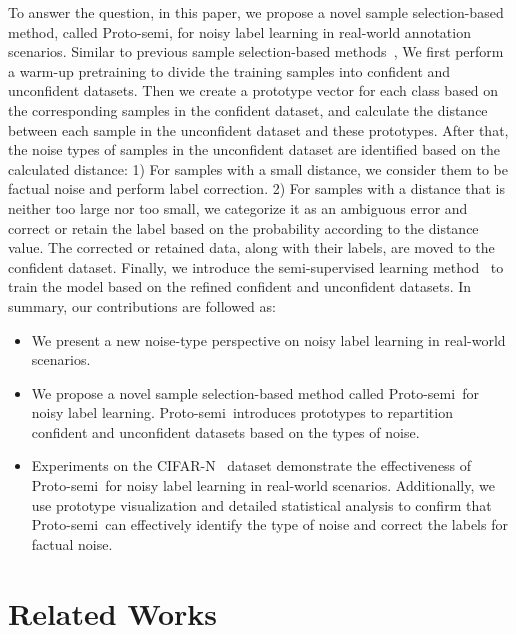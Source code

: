 \documentclass[letterpaper]{article} %
\newcommand{\method}{Proto-semi}
\begin{document}
To answer the question,
in this paper,
we propose a novel sample selection-based method,
called \method,
for noisy label learning in real-world annotation scenarios.
Similar to previous sample selection-based methods~\cite{DBLP:journals/corr/abs-2303-10802, DBLP:journals/corr/abs-2007-08199, DBLP:conf/iclr/WeiZ0L0022},
We first perform a warm-up pretraining to divide the training samples into confident and unconfident datasets.
Then we create a prototype vector for each class based on the corresponding samples in the confident dataset,
and calculate the distance between each sample in the unconfident dataset and these prototypes.
After that, the noise types of samples in the unconfident dataset are identified based on the calculated distance:
1) For samples with a small distance, we consider them to be factual noise and perform label correction.
2) For samples with a distance that is neither too large nor too small,
we categorize it as an ambiguous error and correct or retain the label based on the probability according to the distance value.
The corrected or retained data, along with their labels, are moved to the confident dataset.
Finally, we introduce the semi-supervised learning method~\cite{DBLP:conf/nips/BerthelotCGPOR19} to train the model based on the refined confident and unconfident datasets. In summary, our contributions are followed as:
\begin{itemize}
    \item We present a new noise-type perspective on noisy label learning in real-world scenarios.
    \item We propose a novel sample selection-based method called \method\ for noisy label learning. \method\ introduces prototypes to repartition confident and unconfident datasets based on the types of noise.
    \item Experiments on the CIFAR-N~\cite{DBLP:conf/iclr/WeiZ0L0022} dataset demonstrate the effectiveness of \method\ for noisy label learning in real-world scenarios. Additionally, we use prototype visualization and detailed statistical analysis to confirm that \method\ can effectively identify the type of noise and correct the labels for factual noise.
\end{itemize}



\section{Related Works}
\end{document}
